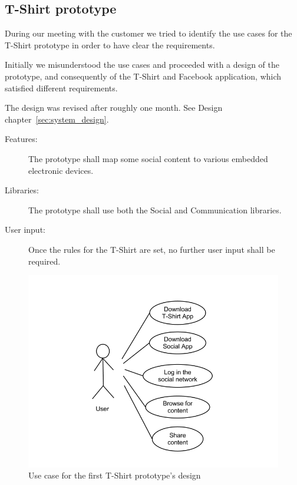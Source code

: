 	\newpage

	\subsection{T-Shirt prototype}

	During our meeting with the customer we tried to identify the
	use cases for the T-Shirt prototype in order to have clear the requirements.

	Initially we misunderstood the use cases and proceeded with a design of
	the prototype, and consequently of the T-Shirt and Facebook application,
	which satisfied different requirements.

	The design was revised after roughly one month. See Design chapter~\ref{sec:system_design}.
	
	\begin{description}
		\item[Features:] The prototype shall map some social content
		to various embedded electronic devices.
		\item[Libraries:] The prototype shall use both the Social and
		Communication libraries.
		\item[User input:] Once the rules for the T-Shirt are set,
		no further user input shall be required.
	\end{description}

	\begin{figure}[h!]
	\centering \includegraphics[scale=0.50]{img/req-usecase1.png}
	\caption{Use case for the first T-Shirt prototype's design}
	\label{fig:req-usecase1}
	\end{figure}

